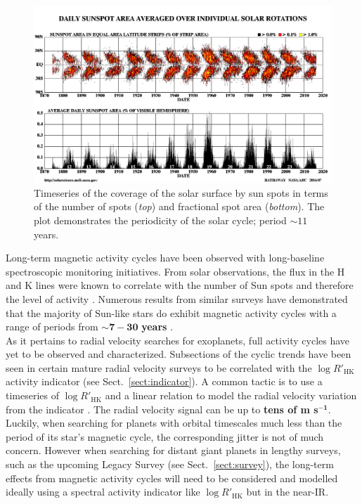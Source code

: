 \begin{figure}
\centering
\includegraphics[scale=.2]{figures/bfly.png}
\caption{Timeseries of the coverage of the solar surface by sun spots in terms of the 
number of spots (\emph{top}) and fractional spot area (\emph{bottom}). The plot demonstrates 
the periodicity of the solar cycle; period $\sim 11$ years. 
\parencite[Image credit:][]{hathaway10} \label{fig:butterfly}}
\end{figure}

Long-term magnetic activity cycles have been observed with long-baseline spectroscopic 
monitoring initiatives. From solar observations, the flux in the \caii{} 
H and K lines were known to correlate with the number of Sun spots and therefore 
the level of activity \parencite{leighton59}. Numerous results from similar 
surveys have 
demonstrated that the majority of Sun-like stars do exhibit magnetic activity cycles 
with a range of periods from $\mathbf{\sim 7-30}$ \textbf{years} 
\parencite{duncan91, lockwood97, balinunas98}. \\

As it pertains to radial velocity searches for exoplanets, full activity cycles have yet 
to be observed and characterized. Subsections of the cyclic trends have been seen in  
certain mature radial velocity surveys \parencite[e.g.][]{lovis11} to be correlated with 
the $\log{R'_{\mathrm{HK}}}$ activity indicator (see Sect.~\ref{sect:indicator}). 
A common tactic is to use a timeseries of $\log{R'_{\mathrm{HK}}}$ and a linear relation to 
model the radial velocity variation from the indicator \parencite{dumusque12}. The radial 
velocity signal can be up to \textbf{tens of m s}$^{\mathbf{-1}}$. Luckily, when searching for 
planets with orbital timescales much less than the period of its star's magnetic cycle, the 
corresponding jitter is not of much concern. However when searching for distant giant planets 
in lengthy surveys, such as the 
upcoming \spirou{} Legacy Survey (see Sect.~\ref{sect:survey}), the long-term effects from 
magnetic activity cycles will need to be considered and modelled ideally using a spectral 
activity indicator like $\log{R'_{\mathrm{HK}}}$ but in the near-IR. \\

